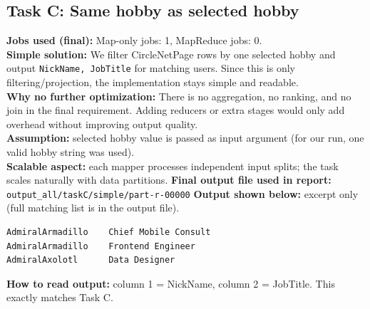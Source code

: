 \documentclass[11pt]{article}
\begin{document}
\subsection*{Task C: Same hobby as selected hobby}
\textbf{Jobs used (final):} Map-only jobs: 1, MapReduce jobs: 0.\\
\textbf{Simple solution:} We filter CircleNetPage rows by one selected hobby and output \texttt{NickName, JobTitle} for matching users. Since this is only filtering/projection, the implementation stays simple and readable.\\
\textbf{Why no further optimization:} There is no aggregation, no ranking, and no join in the final requirement. Adding reducers or extra stages would only add overhead without improving output quality.\\
\textbf{Assumption:} selected hobby value is passed as input argument (for our run, one valid hobby string was used).\\
\textbf{Scalable aspect:} each mapper processes independent input splits; the task scales naturally with data partitions.
\textbf{Final output file used in report:} \texttt{output\_all/taskC/simple/part-r-00000}
\textbf{Output shown below:} excerpt only (full matching list is in the output file).
\begin{lstlisting}
AdmiralArmadillo    Chief Mobile Consult
AdmiralArmadillo    Frontend Engineer
AdmiralAxolotl      Data Designer
\end{lstlisting}
\textbf{How to read output:} column 1 = NickName, column 2 = JobTitle. This exactly matches Task C.
\end{document}
